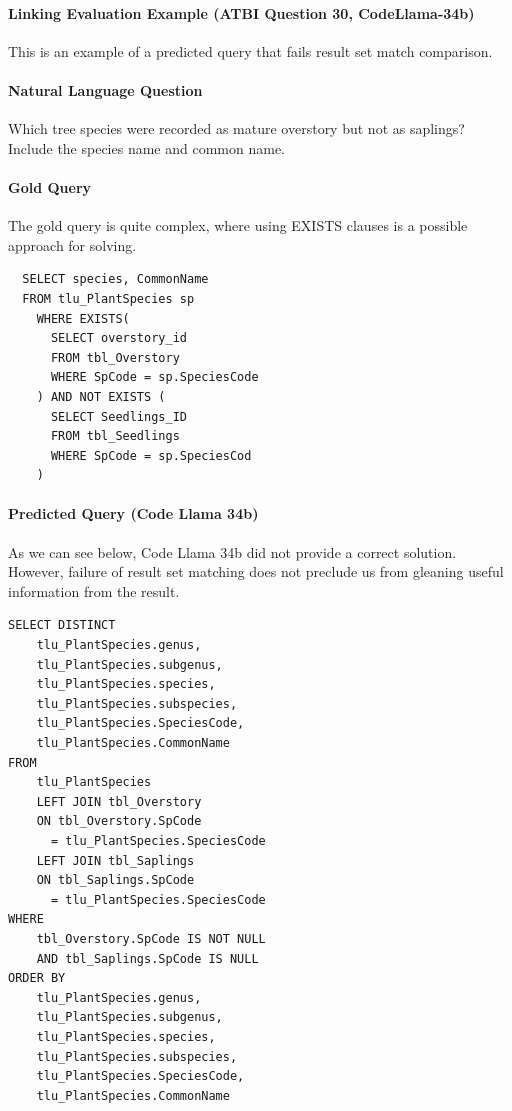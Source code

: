 \paragraph{\textbf{Linking Evaluation Example (ATBI Question 30, CodeLlama-34b)}}
This is an example of a predicted query that fails result set match comparison.

\paragraph{Natural Language Question}
Which tree species were recorded as mature overstory but not as saplings? Include the species name and common name.

\paragraph{Gold Query}
The gold query is quite complex, where using EXISTS clauses is a possible approach for solving.
\begin{verbatim}
  SELECT species, CommonName 
  FROM tlu_PlantSpecies sp 
    WHERE EXISTS(
      SELECT overstory_id  	
      FROM tbl_Overstory  	
      WHERE SpCode = sp.SpeciesCode
    ) AND NOT EXISTS (
      SELECT Seedlings_ID  	
      FROM tbl_Seedlings  	
      WHERE SpCode = sp.SpeciesCod
    )
\end{verbatim}

\paragraph{Predicted Query (Code Llama 34b)} 
As we can see below, Code Llama 34b did not provide a correct solution.
However, failure of result set matching does not preclude us from gleaning useful information from the result.
\begin{verbatim}
SELECT DISTINCT
	tlu_PlantSpecies.genus,
	tlu_PlantSpecies.subgenus,
	tlu_PlantSpecies.species,
	tlu_PlantSpecies.subspecies,
	tlu_PlantSpecies.SpeciesCode,
	tlu_PlantSpecies.CommonName
FROM
	tlu_PlantSpecies
	LEFT JOIN tbl_Overstory 
    ON tbl_Overstory.SpCode 
      = tlu_PlantSpecies.SpeciesCode
	LEFT JOIN tbl_Saplings 
    ON tbl_Saplings.SpCode 
      = tlu_PlantSpecies.SpeciesCode
WHERE
	tbl_Overstory.SpCode IS NOT NULL
	AND tbl_Saplings.SpCode IS NULL
ORDER BY
	tlu_PlantSpecies.genus,
	tlu_PlantSpecies.subgenus,
	tlu_PlantSpecies.species,
	tlu_PlantSpecies.subspecies,
	tlu_PlantSpecies.SpeciesCode,
	tlu_PlantSpecies.CommonName
\end{verbatim}

